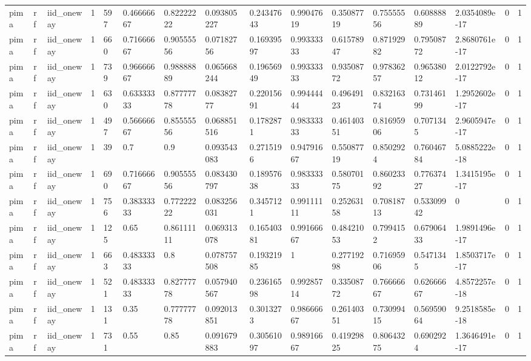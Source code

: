 \begin{tabular}{llllllllllllllll}
pima & rf & iid\_oneway & 1 & 597 & 0.46666667 & 0.82222222 & 0.093805227 & 0.24347643 & 0.99047619 & 0.35087719 & 0.75555556 & 0.60888889 & 2.0354089e-17 & 0 & 1 \\
pima & rf & iid\_oneway & 1 & 660 & 0.71666667 & 0.90555556 & 0.07182756 & 0.16939597 & 0.99333333 & 0.61578947 & 0.87192982 & 0.79508772 & 2.8680761e-17 & 0 & 1 \\
pima & rf & iid\_oneway & 1 & 739 & 0.96666667 & 0.98888889 & 0.065668244 & 0.19656949 & 0.99333333 & 0.93508772 & 0.97836257 & 0.96538012 & 2.0122792e-17 & 0 & 1 \\
pima & rf & iid\_oneway & 1 & 630 & 0.63333333 & 0.87777778 & 0.08382777 & 0.22015691 & 0.99444444 & 0.49649123 & 0.83216374 & 0.73146199 & 1.2952602e-17 & 0 & 1 \\
pima & rf & iid\_oneway & 1 & 497 & 0.56666667 & 0.85555556 & 0.068851516 & 0.1782871 & 0.98333333 & 0.46140351 & 0.81695906 & 0.7071345 & 2.9605947e-17 & 0 & 1 \\
pima & rf & iid\_oneway & 1 & 39 & 0.7 & 0.9 & 0.093543083 & 0.2715196 & 0.94791667 & 0.55087719 & 0.8502924 & 0.76046784 & 5.0885222e-18 & 0 & 1 \\
pima & rf & iid\_oneway & 1 & 690 & 0.71666667 & 0.90555556 & 0.083430797 & 0.18957638 & 0.98333333 & 0.58070175 & 0.86023392 & 0.77637427 & 1.3415195e-17 & 0 & 1 \\
pima & rf & iid\_oneway & 1 & 756 & 0.38333333 & 0.77222222 & 0.083256031 & 0.3457121 & 0.99111111 & 0.25263158 & 0.70818713 & 0.53309942 & 0 & 0 & 1 \\
pima & rf & iid\_oneway & 1 & 125 & 0.65 & 0.86111111 & 0.069313078 & 0.16540381 & 0.99166667 & 0.48421053 & 0.7994152 & 0.67906433 & 1.9891496e-17 & 0 & 1 \\
pima & rf & iid\_oneway & 1 & 663 & 0.48333333 & 0.8 & 0.078757508 & 0.19321985 & 1 & 0.27719298 & 0.71695906 & 0.5471345 & 1.8503717e-17 & 0 & 1 \\
pima & rf & iid\_oneway & 1 & 521 & 0.48333333 & 0.82777778 & 0.057940567 & 0.23616598 & 0.99285714 & 0.33508772 & 0.76666667 & 0.62666667 & 4.8572257e-18 & 0 & 1 \\
pima & rf & iid\_oneway & 1 & 131 & 0.35 & 0.77777778 & 0.092013851 & 0.3013273 & 0.98666667 & 0.26140351 & 0.73099415 & 0.56959064 & 9.2518585e-18 & 0 & 1 \\
pima & rf & iid\_oneway & 1 & 731 & 0.55 & 0.85 & 0.091679883 & 0.30561097 & 0.98916667 & 0.41929825 & 0.80643275 & 0.6902924 & 1.3646491e-17 & 0 & 1 \\

\end{tabular}
